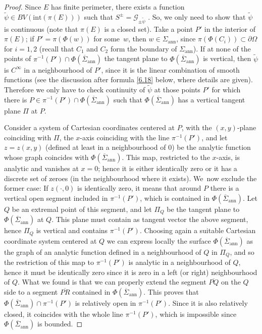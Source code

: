 \documentclass[11pt]{article}
\numberwithin{equation}{section}
\let\Om\Omega
\let\pointinspace P
\newcommand{\openannulus}{\Sigma_\mathrm{ann}}
\newcommand{\immclosedann}{\Phi({\overline\Sigma}_\mathrm{ann})}
\newcommand{\pointinOm}{P'}
\theoremstyle{definition}
\begin{document}
\begin{proof}
Since $E$ has finite perimeter,
there exists a function $\widetilde \psi\in BV(\mathrm{int}(\pi(E)))$
such that
$
S^\pm=\mathcal G_{\pm\widetilde \psi}$ \cite{CCF}. So,
we only need to show that
$\widetilde\psi$ is continuous (note that $\pi(E)$ is a closed set).
Take a point $\pointinOm$ in the interior of $\pi(E)$; if $\pointinOm
=\pi(\Phi(w))$ for some~$w$, then $w\in \openannulus$, since
$\pi(\Phi(C_i)) \subset \partial \Om$
for $i=1,2$ (recall that $C_1$ and $C_2$ form the boundary of $\openannulus$).
If at none of the points of $\pi^{-1}(\pointinOm)\cap
\immclosedann$ the tangent plane to $\immclosedann$ is vertical,
then $\widetilde\psi$ is $C^\infty$ in a neighbourhood of $\pointinOm$,
since it is the linear combination of smooth functions
(see the discussion after formula \eqref{6.18} below, where details are given).
Therefore we only have to check continuity of $\widetilde\psi$
at those points $\pointinOm$ for which there is $\pointinspace\in
\pi^{-1}(\pointinOm)\cap\immclosedann$ such that
$\immclosedann$ has a vertical tangent plane $\Pi$ at $\pointinspace$.

Consider a system of Cartesian coordinates
centered at $ \pointinspace$, with the $(x,y)$-plane
coinciding with $\Pi$, the $x$-axis coinciding with the line $\pi^{-1}( \pointinOm)$,
and let $z=z(x,y)$ (defined at least in a neighbourhood of $0$) be the analytic function whose graph coincides with $\immclosedann$.
This map, restricted to the $x$-axis, is analytic and
vanishes at $x=0$; hence it is
either identically zero or it
has a discrete set of zeroes (in the neighbourhood where it exists). We~now exclude the former case: If $z(\cdot,0)$ is identically zero,
it means that around $\pointinspace$ there is a vertical open
segment included in $\pi^{-1}(\pointinOm)$,
which is
contained in $\immclosedann$. Let $Q$ be an extremal point of this segment, and
let $\Pi_Q$ be the tangent plane to $\immclosedann$ at $Q$.
This plane must
contain as tangent vector the above segment, hence $\Pi_Q$ is vertical and
contains $\pi^{-1}(\pointinOm)$.
Choosing again a suitable Cartesian coordinate system centered at $Q$
we can express locally
the surface $\immclosedann$ as the graph of an analytic function defined in a
neighbourhood of $Q$ in $\Pi_Q$, and so
the restriction of this map to
$\pi^{-1}(\pointinOm)$ is analytic in a neighbourhood of $Q$,
hence it must be identically zero since it is zero in a
left (or right) neighbourhood of $Q$.
What we found is that we can properly extend the segment $\overline{\pointinspace Q}$
on the $Q$ side to a segment $\overline{PR}$ contained in
$\immclosedann$.
This proves that $\immclosedann\cap \pi^{-1}(\pointinOm)$ is relatively open in $\pi^{-1}(\pointinOm)$. Since it is also relatively closed, it coincides with the whole line $\pi^{-1}(\pointinOm)$, which
is impossible since ${\Phi}(\overline\Sigma_\mathrm{ann})$ is bounded.


\end{proof}
\end{document}
